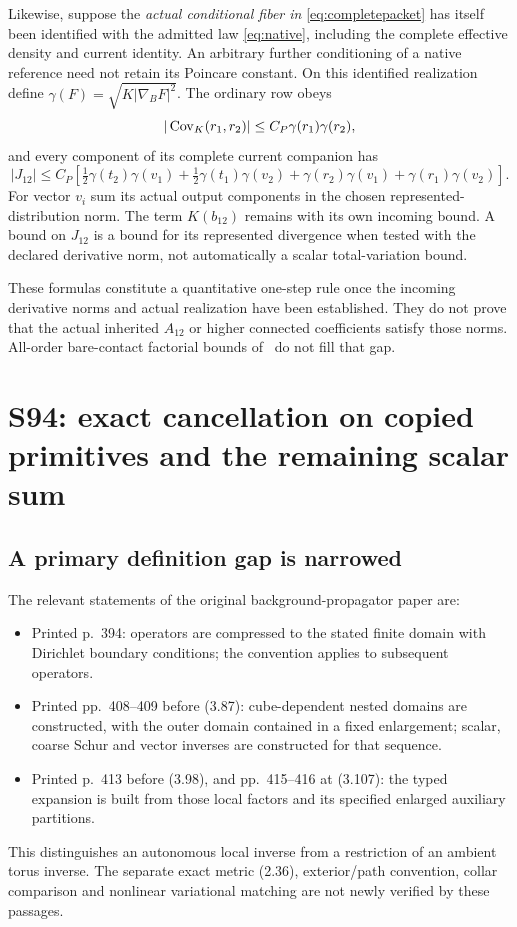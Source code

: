 \documentclass[11pt,letterpaper]{article}
\theoremstyle{remark}\newtheorem{remark}[theorem]{Remark}
\begin{document}
Likewise, suppose the \emph{actual conditional fiber in} \eqref{eq:completepacket} has itself been identified with the admitted law \eqref{eq:native}, including the complete effective density and current identity. An arbitrary further conditioning of a native reference need not retain its Poincare constant. On this identified realization define
$\gamma(F)=\sqrt{K|\nabla_BF|^2}$.
The ordinary row obeys
\[
 |\operatorname{Cov}_K(r_1,r_2)|\le C_P\gamma(r_1)\gamma(r_2),
\]
and every component of its complete current companion has
\[
 |J_{12}|
 \le C_P\left[
 \tfrac12\gamma(t_2)\gamma(v_1)
 +\tfrac12\gamma(t_1)\gamma(v_2)
 +\gamma(r_2)\gamma(v_1)+\gamma(r_1)\gamma(v_2)\right].
\]
For vector $v_i$ sum its actual output components in the chosen represented-distribution norm. The term $K(b_{12})$ remains with its own incoming bound. A bound on $J_{12}$ is a bound for its represented divergence when tested with the declared derivative norm, not automatically a scalar total-variation bound.

These formulas constitute a quantitative one-step rule once the incoming derivative norms and actual realization have been established. They do not prove that the actual inherited $A_{12}$ or higher connected coefficients satisfy those norms. All-order bare-contact factorial bounds of~\cite[\S9]{SZ} do not fill that gap.

\section{S94: exact cancellation on copied primitives and the remaining scalar sum}

\subsection{A primary definition gap is narrowed}

The relevant statements of the original background-propagator paper \cite{BG} are:
\begin{itemize}
\item Printed p.~394: operators are compressed to the stated finite domain with Dirichlet boundary conditions; the convention applies to subsequent operators.
\item Printed pp.~408--409 before (3.87): cube-dependent nested domains are constructed, with the outer domain contained in a fixed enlargement; scalar, coarse Schur and vector inverses are constructed for that sequence.
\item Printed p.~413 before (3.98), and pp.~415--416 at (3.107): the typed expansion is built from those local factors and its specified enlarged auxiliary partitions.
\end{itemize}
This distinguishes an autonomous local inverse from a restriction of an ambient torus inverse. The separate exact metric (2.36), exterior/path convention, collar comparison and nonlinear variational matching are not newly verified by these passages.
\end{document}
